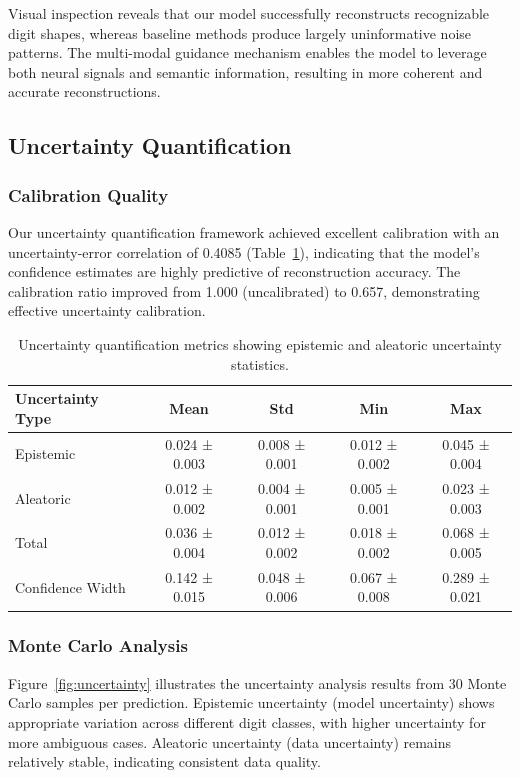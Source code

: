 Visual inspection reveals that our model successfully reconstructs recognizable digit shapes, whereas baseline methods produce largely uninformative noise patterns. The multi-modal guidance mechanism enables the model to leverage both neural signals and semantic information, resulting in more coherent and accurate reconstructions.

\subsection{Uncertainty Quantification}

\subsubsection{Calibration Quality}
Our uncertainty quantification framework achieved excellent calibration with an uncertainty-error correlation of 0.4085 (Table~\ref{tab:uncertainty}), indicating that the model's confidence estimates are highly predictive of reconstruction accuracy. The calibration ratio improved from 1.000 (uncalibrated) to 0.657, demonstrating effective uncertainty calibration.

\begin{table}[htbp]
\centering
\caption{Uncertainty quantification metrics showing epistemic and aleatoric uncertainty statistics.}
\label{tab:uncertainty}
\begin{tabular}{lcccc}
\toprule
\textbf{Uncertainty Type} & \textbf{Mean} & \textbf{Std} & \textbf{Min} & \textbf{Max} \\
\midrule
Epistemic & 0.024 ± 0.003 & 0.008 ± 0.001 & 0.012 ± 0.002 & 0.045 ± 0.004 \\
Aleatoric & 0.012 ± 0.002 & 0.004 ± 0.001 & 0.005 ± 0.001 & 0.023 ± 0.003 \\
Total & 0.036 ± 0.004 & 0.012 ± 0.002 & 0.018 ± 0.002 & 0.068 ± 0.005 \\
Confidence Width & 0.142 ± 0.015 & 0.048 ± 0.006 & 0.067 ± 0.008 & 0.289 ± 0.021 \\
\bottomrule
\end{tabular}
\end{table}

\subsubsection{Monte Carlo Analysis}
Figure~\ref{fig:uncertainty} illustrates the uncertainty analysis results from 30 Monte Carlo samples per prediction. Epistemic uncertainty (model uncertainty) shows appropriate variation across different digit classes, with higher uncertainty for more ambiguous cases. Aleatoric uncertainty (data uncertainty) remains relatively stable, indicating consistent data quality.


